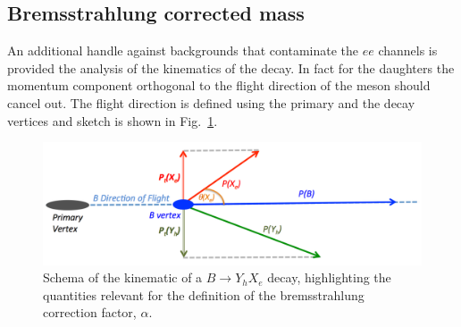 %


\subsection{Bremsstrahlung corrected mass}
\label{sec:HOP}

An additional handle against backgrounds that contaminate the $ee$ channels is provided the analysis of the kinematics of the decay.
In fact for the \Bz daughters the momentum component orthogonal to the flight direction of the \Bz meson should cancel out.
The flight direction is defined using the primary and the decay vertices and sketch is shown in Fig.~\ref{fig:schemaHOP}. 
\begin{figure}[tb]
  \begin{center}
    \includegraphics[width=1.0\linewidth]{RKst/figs/HOP/schemaHOP.pdf}
    \vspace*{-1.0cm}
  \end{center}
  \caption{ Schema of the kinematic of a $B \to Y_h X_e$ decay, highlighting the quantities relevant for the 
  definition of the bremsstrahlung correction factor, $\alpha$.}
  \label{fig:schemaHOP}
\end{figure}

